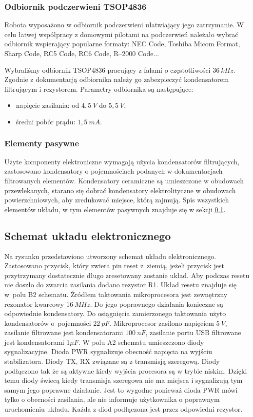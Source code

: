 \documentclass[11pt]{article}
\begin{document}
\subsubsection{Odbiornik podczerwieni TSOP4836}
Robota wyposażono w odbiornik podczerwieni ułatwiający jego zatrzymanie.
W celu łatwej współpracy z domowymi pilotami na podczerwień należało wybrać odbiornik wspierający popularne formaty: NEC Code, Toshiba Micom Format, Sharp Code, RC5 Code, RC6 Code, R–2000 Code...

Wybraliśmy odbiornik TSOP4836 pracujący z falami o częstotliwości $ 36\ kHz $. Zgodnie z dokumentacją %
 odbiornika należy go zabezpieczyć kondensatorem filtrującym i rezystorem. Parametry odbiornika są następujące:
\begin{itemize}
	\item napięcie zasilania: od $ 4,5\ V $ do $ 5,5\ V $,
	\item średni pobór prądu: $ 1,5\ mA$.
\end{itemize}

\subsubsection{Elementy pasywne}
Użyte komponenty elektroniczne wymagają użycia kondensatorów filtrujących, zastosowano kondensatory o pojemnościach podanych w dokumentacjach filtrowanych elementów.
Kondensatory ceramiczne są umieszczone w obudowach przewlekanych, starano się dobrać kondensatory elektrolityczne w obudowach powierzchniowych, aby zredukować miejsce, którą zajmują.
Spis wszystkich elementów układu, w tym elementów pasywnych znajduje się w sekcji \ref{sec:schem}.
\subsection{Schemat układu elektronicznego}
\label{sec:schem}
Na rysunku %
przedstawiono utworzony schemat układu elektronicznego.
Zastosowano przycisk, który zwiera pin reset z~ziemią, jeżeli przycisk jest przytrzymany dostatecznie długo zresetowany zostanie układ.
Aby podczas resetu nie doszło do zwarcia zasilania dodano rezystor R1. Układ resetu znajduje się w~polu B2 schematu.
Źródłem taktowania mikroprocesora jest zewnętrzny rezonator kwarcowy $ 16\ MHz $. Do jego poprawnego działania konieczne są odpowiednie kondensatory. Do osiągnięcia zamierzonego taktowania użyto kondensatorów o~pojemności $ 22\ pF $. Mikroprocesor zasilono napięciem $ 5\ V $, zasilanie filtrowane jest kondensatorami $ 100\ nF $, zasilanie portu USB filtrowane jest kondensatorami $ 1 \mu F $.
W polu A2 schematu umieszczono diody sygnalizacyjne.
Dioda PWR sygnalizuje obecność napięcia na wyjściu stabilizatora.
Diody TX, RX związane są z transmisją szeregową.
Diody podłączono tak że są aktywne kiedy wyjścia procesora są w trybie niskim.
Dzięki temu diody świecą kiedy transmisja szeregowa nie ma miejsca i sygnalizują tym samym jego poprawne działanie.
Jest to wygodne ponieważ dioda PWR mówi tylko o obecności zasilania, ale nie informuje użytkownika o poprawnym uruchomieniu układu.
Każda z diod podłączona jest przez odpowiedni rezystor.
\end{document}
